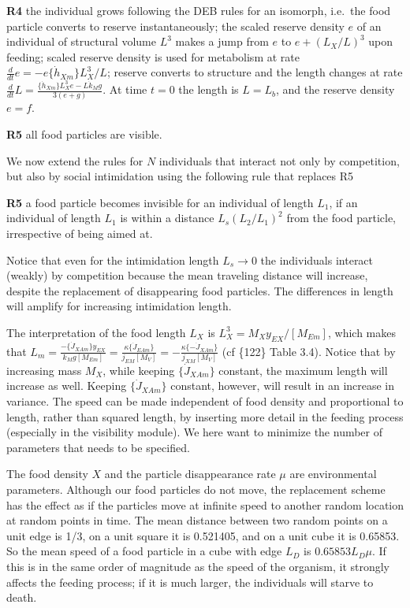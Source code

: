 {\bf R4} the individual grows following the DEB rules for an isomorph, i.e.\ the food particle converts to reserve instantaneously; 
the scaled reserve density $e$ of an individual of structural volume $L^3$ makes a jump from $e$ to $e + (L_X/ L)^3$ upon feeding; 
scaled reserve density is used for metabolism at rate 
$\frac{d} {dt} e = - e \{\dot{h}_{Xm}\} L_X^3/ L$; 
reserve converts to structure and the length changes at rate 
$\frac{d} {dt} L = \frac{\{\dot{h}_{Xm}\} L_X^3 e - L \dot{k}_M g} {3 (e + g)}$. 
At time $t = 0$ the length is $L = L_b$, and the reserve density $e = f$.

{\bf R5} all food particles are visible.
  
We now extend the rules for $N$ individuals that interact not only by competition, but also by social intimidation using the following rule that replaces R5
  
{\bf R5} a food particle becomes invisible for an individual of length $L_1$, if an individual of length $L_1$ is within a distance $L_s (L_2/ L_1)^2$ from the food particle, irrespective of being aimed at.
  
Notice that even for the intimidation length $L_s \rightarrow 0$ the individuals interact (weakly) by competition because the mean traveling distance will increase, despite the replacement of disappearing food particles. 
The differences in length will amplify for increasing intimidation length.
  
The interpretation of the food length $L_X$ is $L_X^3 = M_X y_{EX}/ [M_{Em}]$, which makes that 
$L_m = \frac{- \{\dot{J}_{XAm}\} y_{EX}} {k_M g [M_{Em}]} 
= \frac{\kappa \{\dot{J}_{EAm}\}} {j_{EM} [M_V]} 
= - \frac{\kappa \{-\dot{J}_{XAm}\}} {j_{XM} [M_V]}$ 
(cf \{122\} Table 3.4).
Notice that by increasing mass $M_X$, while keeping $\{\dot{J}_{XAm}\}$ constant, the maximum length will increase as well. 
Keeping $\{\dot{J}_{XAm}\}$ constant, however, will result in an increase in variance. 
The speed can be made independent of food density and proportional to length, rather than squared length, by inserting more detail in the feeding process (especially in the visibility module).
We here want to minimize the number of parameters that needs to be specified.

The food density $X$ and the particle disappearance rate $\mu$ are environmental parameters. 
Although our food particles do not move, the replacement scheme has the effect as if the particles move at infinite
speed to another random location at random points in time.  
The mean distance between two random points on a unit edge is 1/3, on a unit square it is 0.521405, and on a unit cube it is 0.65853.  
So the mean speed of a food particle in a cube with edge $L_D$ is $0.65853 L_D \mu$. 
If this is in the same order of magnitude as the speed of the organism, it strongly affects the feeding process; if it is much larger, the individuals will starve to death.
  
